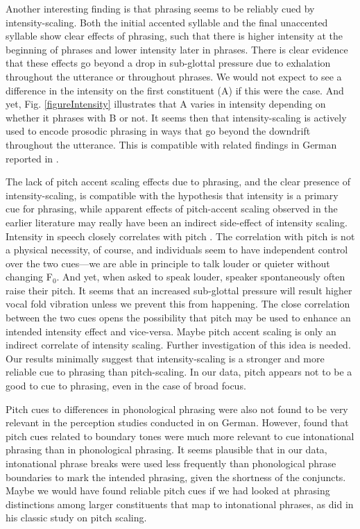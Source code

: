 \documentclass[preprint,review,12pt,authoryear,times]{elsarticle}
\begin{document}
Another interesting finding is that phrasing seems to be reliably cued by intensity-scaling. Both the initial accented syllable and the final unaccented syllable show clear effects of phrasing, such that there is higher intensity at the beginning of phrases and lower intensity later in phrases. There is clear evidence that these effects go beyond a drop in sub-glottal pressure due to exhalation throughout the utterance or throughout phrases. We would not expect to see a difference in the intensity on the first constituent (A) if this were the case. And yet, Fig. \ref{figureIntensity} illustrates that A varies in intensity depending on whether it phrases with B or not. It seems then that intensity-scaling is actively used to encode prosodic phrasing in ways that go beyond the downdrift throughout the utterance. This is compatible with related findings in German reported in \citet{poschmannwagner16}.  

The lack of pitch accent scaling effects due to phrasing, and the clear presence of intensity-scaling, is compatible with the hypothesis that intensity is a primary cue for phrasing, while apparent effects of pitch-accent scaling observed in the earlier literature may really have been an indirect side-effect of intensity scaling.  Intensity in speech closely correlates with pitch \citep{gramm88}. The correlation with pitch is not a physical necessity, of course, and individuals seem to have independent control over the two cues---we are able in principle to talk louder or quieter without changing F$_0$.  And yet, when asked to speak louder, speaker spontaneously often raise their pitch. It seems that an increased sub-glottal pressure will result higher vocal fold vibration unless we prevent this from happening. The close correlation between the two cues opens the possibility that pitch may be used to enhance an intended intensity effect and vice-versa. Maybe pitch accent scaling is only an indirect correlate of intensity scaling. Further investigation of this idea is needed. Our results minimally suggest that intensity-scaling is a stronger and more reliable cue to phrasing than pitch-scaling. In our data, pitch appears not to be a good to cue to phrasing, even in the case of broad focus.

Pitch cues to differences in phonological phrasing were also not found to be very relevant in the perception studies conducted in \citet{gollr13} on German.  However, \citet{gollr13} found that pitch cues related to boundary tones were much more relevant to cue intonational phrasing than in phonological phrasing. It seems plausible that in our data, intonational phrase breaks were used less frequently than phonological phrase boundaries to mark the intended phrasing, given the shortness of the conjuncts. Maybe we would have found reliable pitch cues if we had looked at phrasing distinctions among larger constituents that map to intonational phrases, as \citet{ladd88} did in his classic study on pitch scaling. 
\end{document}
